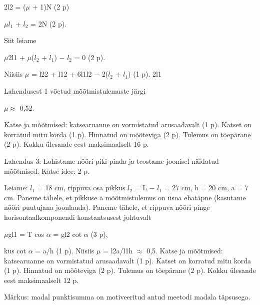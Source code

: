 2l2 = ($\mu$ + 1)N (2 p)

$\mu$$l_1$ + $l_2$ = 2N (2 p).

Siit leiame

$\mu$2l1 + $\mu$($l_2$ + $l_1$) $-$ $l_2$ = 0 (2 p).

Niisiis $\mu$ = l22 + l12 + 6l1l2 $-$ 2($l_2$ + $l_1$) (1 p). 2l1

Lahendusest 1 võetud mõõtmistulemuste järgi

$\mu \approx$ 0,52.

Katse ja mõõtmised: katsearuanne on vormistatud arusaadavalt (1 p). Katset on korratud mitu korda (1 p). Hinnatud on mõõteviga (2 p). Tulemus on tõepärane (2 p). Kokku ülesande eest maksimaalselt 16 p.

Lahendus 3: Lohistame nööri piki pinda ja teostame joonisel näidatud mõõtmised. Katse idee: 2 p.

Leiame: $l_1$ = 18 cm, rippuva osa pikkus $l_2$ = L $-$ $l_1$ = 27 cm, h = 20 cm, a = 7 cm. Paneme tähele, et pikkuse a mõõtmistulemus on üsna ebatäpne (kasutame nööri puutujana joonlauda). Paneme tähele, et rippuva nööri pinge horisontaalkomponendi konstantsusest johtuvalt

$\mu$gl1 = T cos $\alpha$ = gl2 cot $\alpha$ (3 p),

kus cot $\alpha$ = a/h (1 p). Niisiis $\mu$ = l2a/l1h $\approx$ 0,5. Katse ja mõõtmised: katsearuanne on vormistatud arusaadavalt (1 p). Katset on korratud mitu korda (1 p). Hinnatud on mõõteviga (2 p). Tulemus on tõepärane (2 p). Kokku ülesande eest maksimaalselt 12 p.

Märkus: madal punktisumma on motiveeritud antud meetodi madala täpsusega.
\probend
